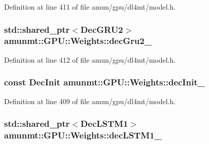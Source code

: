Definition at line 411 of file amun/gpu/dl4mt/model.\+h.

\subsubsection[{\texorpdfstring{dec\+Gru2\+\_\+}{decGru2_}}]{\setlength{\rightskip}{0pt plus 5cm}std\+::shared\+\_\+ptr$<${\bf Dec\+G\+R\+U2}$>$ amunmt\+::\+G\+P\+U\+::\+Weights\+::dec\+Gru2\+\_\+}\hypertarget{structamunmt_1_1GPU_1_1Weights_a6f333b8ce7efa26bdb44acf4902b651e}{}\label{structamunmt_1_1GPU_1_1Weights_a6f333b8ce7efa26bdb44acf4902b651e}


Definition at line 412 of file amun/gpu/dl4mt/model.\+h.

\subsubsection[{\texorpdfstring{dec\+Init\+\_\+}{decInit_}}]{\setlength{\rightskip}{0pt plus 5cm}const {\bf Dec\+Init} amunmt\+::\+G\+P\+U\+::\+Weights\+::dec\+Init\+\_\+}\hypertarget{structamunmt_1_1GPU_1_1Weights_a5b9ce1181f97a74b6cfaaf8885b14de7}{}\label{structamunmt_1_1GPU_1_1Weights_a5b9ce1181f97a74b6cfaaf8885b14de7}


Definition at line 409 of file amun/gpu/dl4mt/model.\+h.

\subsubsection[{\texorpdfstring{dec\+L\+S\+T\+M1\+\_\+}{decLSTM1_}}]{\setlength{\rightskip}{0pt plus 5cm}std\+::shared\+\_\+ptr$<${\bf Dec\+L\+S\+T\+M1}$>$ amunmt\+::\+G\+P\+U\+::\+Weights\+::dec\+L\+S\+T\+M1\+\_\+}\hypertarget{structamunmt_1_1GPU_1_1Weights_a9d6a84a46778f44da098e09deabd1434}{}\label{structamunmt_1_1GPU_1_1Weights_a9d6a84a46778f44da098e09deabd1434}


